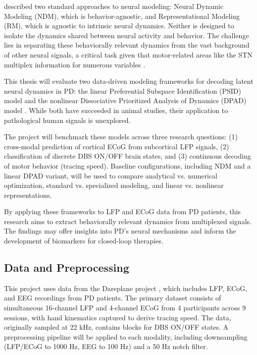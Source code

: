 \documentclass[12pt, a4paper]{article}
\begin{document}
\textcite{saniModelingBehaviorallyRelevant2021} described two standard approaches to neural modeling: Neural Dynamic Modeling (NDM), which is behavior-agnostic, and Representational Modeling (RM), which is agnostic to intrinsic neural dynamics. Neither is designed to isolate the dynamics shared between neural activity and behavior. The challenge lies in separating these behaviorally relevant dynamics from the vast background of other neural signals, a critical task given that motor-related areas like the STN multiplex information for numerous variables \parencite{wuMixedSelectivitySubthalamic2025}.

This thesis will evaluate two data-driven modeling frameworks for decoding latent neural dynamics in PD: the linear Preferential Subspace Identification (PSID) model \parencite{saniModelingBehaviorallyRelevant2021} and the nonlinear Dissociative Prioritized Analysis of Dynamics (DPAD) model \parencite{saniDissociativePrioritizedModeling2024}. While both have succeeded in animal studies, their application to pathological human signals is unexplored.

The project will benchmark these models across three research questions: (1) cross-modal prediction of cortical ECoG from subcortical LFP signals, (2) classification of discrete DBS ON/OFF brain states, and (3) continuous decoding of motor behavior (tracing speed). Baseline configurations, including NDM and a linear DPAD variant, will be used to compare analytical vs. numerical optimization, standard vs. specialized modeling, and linear vs. nonlinear representations.

By applying these frameworks to LFP and ECoG data from PD patients, this research aims to extract behaviorally relevant dynamics from multiplexed signals. The findings may offer insights into PD's neural mechanisms and inform the development of biomarkers for closed-loop therapies.

\subsection{Data and Preprocessing}
This project uses data from the Dareplane project \parencite{doldLFPECoGData2024}, which includes LFP, ECoG, and EEG recordings from PD patients. The primary dataset consists of simultaneous 16-channel LFP and 4-channel ECoG from 4 participants across 9 sessions, with hand kinematics captured to derive tracing speed. The data, originally sampled at 22 kHz, contains blocks for DBS ON/OFF states. A preprocessing pipeline will be applied to each modality, including downsampling (LFP/ECoG to 1000 Hz, EEG to 100 Hz) and a 50 Hz notch filter.
\end{document}
